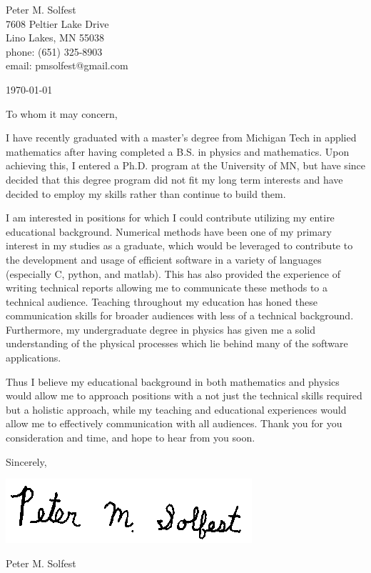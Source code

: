 \documentclass[letterpaper,12pt]{article}
\begin{document}
Peter M. Solfest\\
7608 Peltier Lake Drive\\
Lino Lakes, MN 55038\\
phone: (651) 325-8903\\
email: pmsolfest@gmail.com

\today


To whom it may concern, %

I have recently graduated with a master's degree from Michigan Tech in applied mathematics after
having completed a B.S. in physics and mathematics.
Upon achieving this, I entered a Ph.D. program at the University of MN, but have since
decided that this degree program did not fit my long term interests and have decided to
employ my skills rather than continue to build them.

I am interested in positions for which I could contribute utilizing my entire educational background.
Numerical methods have been one of my primary interest in my studies as a graduate,
which would be leveraged to contribute to the development and usage of efficient software in a 
variety of languages (especially C, python, and matlab).
This has also provided the experience of writing technical reports allowing me to 
communicate these methods to a technical audience.
Teaching throughout my education has honed these communication skills 
for broader audiences with less of a technical background.
Furthermore, my undergraduate degree in physics has given me a solid understanding of the
physical processes which lie behind many of the software applications.

Thus I believe my educational background in both mathematics and physics would allow 
me to approach positions with a not just the technical skills required but a holistic approach,
while my teaching and educational experiences would allow me to 
effectively communication with all audiences.
Thank you for you consideration and time, and hope to hear from you soon.

Sincerely,

\includegraphics[height=.5in]{signature.png}

Peter M. Solfest
\end{document}
